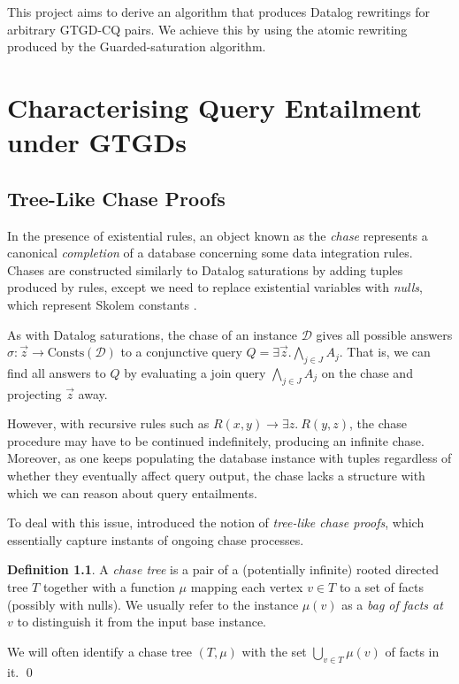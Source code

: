 \documentclass[12pt]{report}
\theoremstyle{plain}
\theoremstyle{definition}
\newtheorem{definition}[theorem]{Definition}
\def\Consts{{\mathrm{Consts}}}
\begin{document}
This project aims to derive an algorithm that produces Datalog rewritings for arbitrary GTGD-CQ pairs. We achieve this by using the atomic rewriting produced by the Guarded-saturation algorithm.

\newpage
\chapter{Characterising Query Entailment under GTGDs}
\label{characterising-query-entailment-under-gtgds}

\section{Tree-Like Chase Proofs}

In the presence of existential rules, an object known as the \emph{chase} represents a canonical \emph{completion} of a database concerning some data integration rules. Chases are constructed similarly to Datalog saturations by adding tuples produced by rules, except we need to replace existential variables with \emph{nulls}, which represent Skolem constants \cite{fagin_kolaitis_miller_popa_2005}.

As with Datalog saturations, the chase of an instance $\mathcal{D}$ gives all possible answers $\sigma: \vec{z} \rightarrow \Consts(\mathcal{D})$ to a conjunctive query $Q = \exists \vec{z}. \bigwedge_{j \in J} A_j$. That is, we can find all answers to $Q$ by evaluating a join query $\bigwedge_{j \in J} A_j$ on the chase and projecting $\vec{z}$ away.

However, with recursive rules such as $R(x, y) \rightarrow \exists z.\ R(y, z)$, the chase procedure may have to be continued indefinitely, producing an infinite chase. Moreover, as one keeps populating the database instance with tuples regardless of whether they eventually affect query output, the chase lacks a structure with which we can reason about query entailments.

To deal with this issue, \cite{benedikt_buron_germano_kappelmann_motik_2022} introduced the notion of \emph{tree-like chase proofs}, which essentially capture instants of ongoing chase processes.

\begin{definition}
  A \emph{chase tree} is a pair of a (potentially infinite) rooted directed tree $T$ together with a function $\mu$ mapping each vertex $v \in T$ to a set of facts (possibly with nulls). We usually refer to the instance $\mu(v)$ as a \emph{bag of facts at $v$} to distinguish it from the input base instance.
  
  We will often identify a chase tree $(T, \mu)$ with the set $\bigcup_{v \in T} \mu(v)$ of facts in it.
  \qed
\end{definition}
\end{document}
